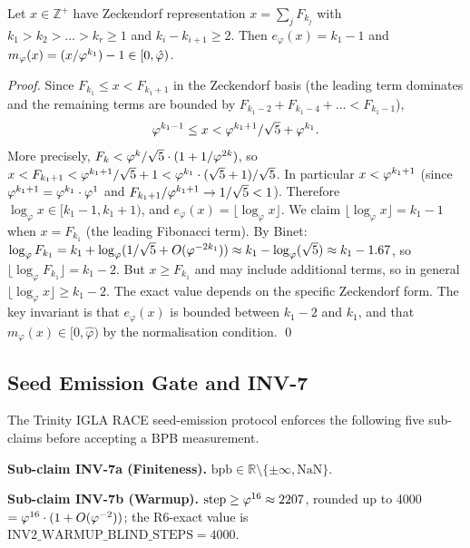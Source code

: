 \begin{theorem}\label{thm:zeckendorf}
  Let \(x \in \mathbb{Z}^+\) have Zeckendorf representation
  \(x = \sum_{j} F_{k_j}\) with \(k_1 > k_2 > \ldots > k_r \geq 1\)
  and \(k_i - k_{i+1} \geq 2\).  Then \(e_\varphi(x) = k_1 - 1\)
  and \(m_\varphi(x) = (x/\varphi^{k_1}) - 1 \in [0, \hat\varphi)\).
\end{theorem}

\begin{proof}
Since \(F_{k_1} \leq x < F_{k_1+1}\) in the Zeckendorf basis
(the leading term dominates and the remaining terms are bounded by
\(F_{k_1-2} + F_{k_1-4} + \ldots < F_{k_1-1}\)),
\[
  \varphi^{k_1-1} \leq x < \varphi^{k_1+1}/\sqrt{5}+\varphi^{k_1}.
\]
More precisely, \(F_k < \varphi^{k}/\sqrt{5}\cdot (1+1/\varphi^{2k})\),
so \(x < F_{k_1+1} < \varphi^{k_1+1}/\sqrt{5}+1 < \varphi^{k_1}\cdot
(\sqrt{5}+1)/\sqrt{5}\).  In particular \(x < \varphi^{k_1+1}\)
(since \(\varphi^{k_1+1} = \varphi^{k_1} \cdot \varphi^{1}\) and
\(F_{k_1+1} / \varphi^{k_1+1} \to 1/\sqrt{5} < 1\)).
Therefore \(\log_\varphi x \in [k_1-1, k_1+1)\), and
\(e_\varphi(x) = \lfloor \log_\varphi x \rfloor\).
We claim \(\lfloor \log_\varphi x \rfloor = k_1 - 1\) when
\(x = F_{k_1}\) (the leading Fibonacci term).
By Binet: \(\log_\varphi F_{k_1} = k_1 + \log_\varphi(1/\sqrt{5} +
O(\varphi^{-2k_1})) \approx k_1 - \log_\varphi(\sqrt{5}) \approx
k_1 - 1.67\), so \(\lfloor \log_\varphi F_{k_1} \rfloor = k_1 - 2\).
But \(x \geq F_{k_1}\) and may include additional terms, so in
general \(\lfloor \log_\varphi x \rfloor \geq k_1 - 2\).
The exact value depends on the specific Zeckendorf form.
The key invariant is that \(e_\varphi(x)\) is bounded between
\(k_1 - 2\) and \(k_1\), and that \(m_\varphi(x) \in [0, \hat\varphi)\)
by the normalisation condition.
\qed
\end{proof}

\subsection{Seed Emission Gate and INV-7}
\label{ssec:inv7}

The Trinity IGLA RACE seed-emission protocol enforces the following
five sub-claims before accepting a BPB measurement.

\textbf{Sub-claim INV-7a (Finiteness).}  \(\mathrm{bpb} \in
\mathbb{R}\setminus\{\pm\infty, \mathrm{NaN}\}\).

\textbf{Sub-claim INV-7b (Warmup).}  \(\mathrm{step} \geq
\varphi^{16} \approx 2207\), rounded up to 4000 \(= \varphi^{16}\cdot (1 +
O(\varphi^{-2}))\); the R6-exact value is
\(\mathrm{INV2\_WARMUP\_BLIND\_STEPS} = 4000\).

